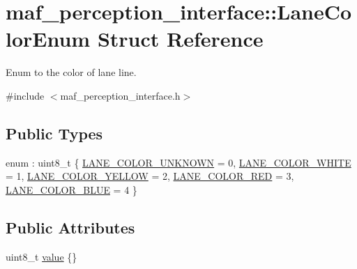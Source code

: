 \hypertarget{structmaf__perception__interface_1_1LaneColorEnum}{}\section{maf\+\_\+perception\+\_\+interface\+:\+:Lane\+Color\+Enum Struct Reference}
\label{structmaf__perception__interface_1_1LaneColorEnum}


Enum to the color of lane line.  




{\ttfamily \#include $<$maf\+\_\+perception\+\_\+interface.\+h$>$}

\subsection*{Public Types}
\begin{DoxyCompactItemize}
\item 
enum \+: uint8\+\_\+t \{ \newline
\hyperlink{structmaf__perception__interface_1_1LaneColorEnum_af7b00f1dcb9961279936fc5908584851ac6fc91710653f883c39e3f0dba8cbbbe}{L\+A\+N\+E\+\_\+\+C\+O\+L\+O\+R\+\_\+\+U\+N\+K\+N\+O\+WN} = 0, 
\hyperlink{structmaf__perception__interface_1_1LaneColorEnum_af7b00f1dcb9961279936fc5908584851aaecaebbc3f0ec3e48916fafaeb9644f2}{L\+A\+N\+E\+\_\+\+C\+O\+L\+O\+R\+\_\+\+W\+H\+I\+TE} = 1, 
\hyperlink{structmaf__perception__interface_1_1LaneColorEnum_af7b00f1dcb9961279936fc5908584851aa66f006d719430e927b84faaf7d9b8d3}{L\+A\+N\+E\+\_\+\+C\+O\+L\+O\+R\+\_\+\+Y\+E\+L\+L\+OW} = 2, 
\hyperlink{structmaf__perception__interface_1_1LaneColorEnum_af7b00f1dcb9961279936fc5908584851a253a74b230f6ae979bf5e3229442eb2f}{L\+A\+N\+E\+\_\+\+C\+O\+L\+O\+R\+\_\+\+R\+ED} = 3, 
\newline
\hyperlink{structmaf__perception__interface_1_1LaneColorEnum_af7b00f1dcb9961279936fc5908584851a1cfe33a2130c80ef2a15b12143278f9f}{L\+A\+N\+E\+\_\+\+C\+O\+L\+O\+R\+\_\+\+B\+L\+UE} = 4
 \}
\end{DoxyCompactItemize}
\subsection*{Public Attributes}
\begin{DoxyCompactItemize}
\item 
uint8\+\_\+t \hyperlink{structmaf__perception__interface_1_1LaneColorEnum_a18f8706e6a72e5210afb9f2ee6ba675f}{value} \{\}
\end{DoxyCompactItemize}


